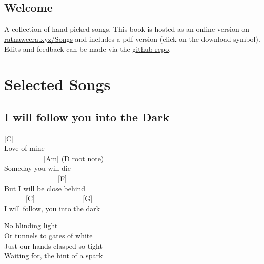 \documentclass[
  letterpaper,
  twoside=false]{scrbook}
\renewcommand*\contentsname{Table of contents}
\newcommand\contentsname{Table of contents}
\begin{document}
\ifdefined\Shaded\renewenvironment{Shaded}{\begin{tcolorbox}[borderline west={3pt}{0pt}{shadecolor}, enhanced, boxrule=0pt, interior hidden, frame hidden, sharp corners, breakable]}{\end{tcolorbox}}\fi

\renewcommand*\contentsname{Table of contents}
{
\setcounter{tocdepth}{2}
\tableofcontents
}
\mainmatter
{}

\hypertarget{title}{%
\chapter*{Welcome}\label{title}}


A collection of hand picked songs. This book is hosted as an online
version on \href{http://www.ratnaweera.xyz/Songs}{ratnaweera.xyz/Songs}
and includes a pdf version (click on the download symbol). Edits and
feedback can be made via the
\href{https://github.com/ratnanil/songs}{github repo}.

\part{Selected Songs}

\hypertarget{i-will-follow-you-into-the-dark}{%
\chapter{I will follow you into the
Dark}\label{i-will-follow-you-into-the-dark}}

{[}C{]}\\
Love of mine\\
\hspace*{0.333em} ~ ~ ~ ~ ~ ~ ~{[}Am{]} (D root note)\\
Someday you will die\\
\hspace*{0.333em} ~ ~ ~ ~ ~ ~ ~ ~ ~ {[}F{]}\\
But I will be close behind\\
\hspace*{0.333em} ~ ~ ~ ~{[}C{]} ~ ~ ~ ~ ~ ~ ~ ~{[}G{]}\\
I will follow, you into the dark

No blinding light\\
Or tunnels to gates of white\\
Just our hands clasped so tight\\
Waiting for, the hint of a spark
\end{document}
